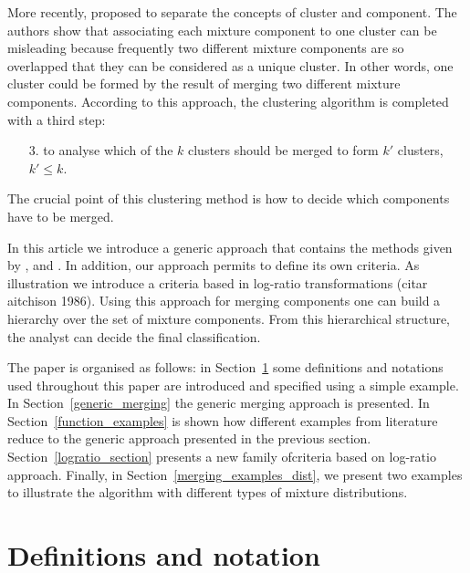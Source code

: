 \documentclass[10pt, a4paper]{article}
\begin{document}
\begin{spacing}{1.9}
More recently, \cite{lee2004combining,hennig2010methods,baudry2010combining,melnykov2013distribution,pastore2013merging} proposed to separate the concepts of cluster and component. The authors show that associating each mixture component to one cluster can be misleading because frequently two different mixture components are so overlapped that they can be considered as a unique cluster. In other words, one cluster could be formed by the result of merging two different mixture components. According to this approach, the clustering algorithm is completed with a third step:

\begin{itemize}
\item[3.] to analyse which of the $k$ clusters should be merged to form $k'$ clusters, $k' \leq k$.
\end{itemize}

The crucial point of this clustering method is how to decide which components have to be merged.


In this article we introduce a generic approach that contains the methods given by \cite{baudry2010combining}, \cite{hennig2010methods} and \cite{longford2014}. In addition, our approach permits to define its own criteria. As illustration we introduce a criteria based in log-ratio transformations (citar aitchison 1986). Using this approach for merging components one can build a hierarchy over the set of mixture components. From this hierarchical structure, the analyst can decide the final classification.

The paper is organised as follows: in Section~\ref{definitions} some definitions and notations used throughout this paper are introduced and specified using a simple example. In Section~\ref{generic_merging} the generic merging approach is presented. In Section~\ref{function_examples} is shown how different examples from literature reduce to the generic approach presented in the previous section. Section~\ref{logratio_section} presents a new family ofcriteria based on log-ratio approach. Finally, in Section~\ref{merging_examples_dist}, we present two examples to illustrate the algorithm with different types of mixture distributions.

\section{Definitions and notation}\label{definitions}


\end{spacing}
\end{document}
